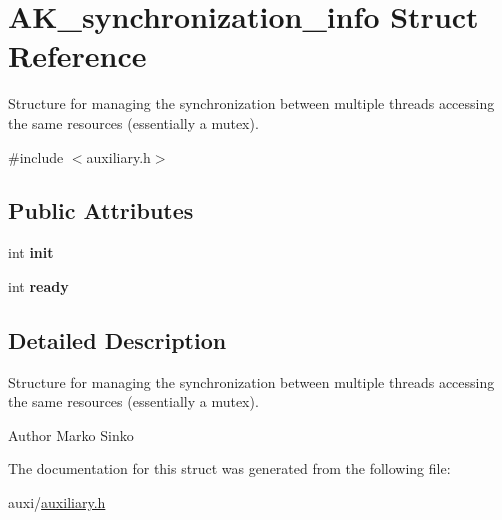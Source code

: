 \hypertarget{structAK__synchronization__info}{}\section{A\+K\+\_\+synchronization\+\_\+info Struct Reference}
\label{structAK__synchronization__info}


Structure for managing the synchronization between multiple threads accessing the same resources (essentially a mutex).  




{\ttfamily \#include $<$auxiliary.\+h$>$}

\subsection*{Public Attributes}
\begin{DoxyCompactItemize}
\item 
\mbox{\label{structAK__synchronization__info_a910c628044a9d1de44240528ac249676}} 
int {\bfseries init}
\item 
\mbox{\label{structAK__synchronization__info_a66e21d3865ab709a02f32b8b7ce8537d}} 
int {\bfseries ready}
\end{DoxyCompactItemize}


\subsection{Detailed Description}
Structure for managing the synchronization between multiple threads accessing the same resources (essentially a mutex). 

\begin{DoxyAuthor}{Author}
Marko Sinko 
\end{DoxyAuthor}


The documentation for this struct was generated from the following file\+:\begin{DoxyCompactItemize}
\item 
auxi/\hyperlink{auxiliary_8h}{auxiliary.\+h}\end{DoxyCompactItemize}
